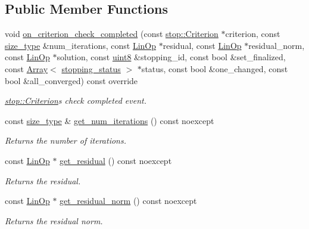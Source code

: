 \subsection*{Public Member Functions}
\begin{DoxyCompactItemize}
\item 
void \hyperlink{classgko_1_1log_1_1Convergence_ae20904a348216c22750c266372b07b6e}{on\+\_\+criterion\+\_\+check\+\_\+completed} (const \hyperlink{classgko_1_1stop_1_1Criterion}{stop\+::\+Criterion} $\ast$criterion, const \hyperlink{namespacegko_a6e5c95df0ae4e47aab2f604a22d98ee7}{size\+\_\+type} \&num\+\_\+iterations, const \hyperlink{classgko_1_1LinOp}{Lin\+Op} $\ast$residual, const \hyperlink{classgko_1_1LinOp}{Lin\+Op} $\ast$residual\+\_\+norm, const \hyperlink{classgko_1_1LinOp}{Lin\+Op} $\ast$solution, const \hyperlink{namespacegko_a3950fc3732811a8563484e5098c31531}{uint8} \&stopping\+\_\+id, const bool \&set\+\_\+finalized, const \hyperlink{classgko_1_1Array}{Array}$<$ \hyperlink{classgko_1_1stopping__status}{stopping\+\_\+status} $>$ $\ast$status, const bool \&one\+\_\+changed, const bool \&all\+\_\+converged) const override
\begin{DoxyCompactList}\small\item\em \hyperlink{classgko_1_1stop_1_1Criterion}{stop\+::\+Criterion}\textquotesingle{}s check completed event. \end{DoxyCompactList}\item 
const \hyperlink{namespacegko_a6e5c95df0ae4e47aab2f604a22d98ee7}{size\+\_\+type} \& \hyperlink{classgko_1_1log_1_1Convergence_ae4f2ae84d87df2bffa814f51a8f09793}{get\+\_\+num\+\_\+iterations} () const noexcept
\begin{DoxyCompactList}\small\item\em Returns the number of iterations. \end{DoxyCompactList}\item 
const \hyperlink{classgko_1_1LinOp}{Lin\+Op} $\ast$ \hyperlink{classgko_1_1log_1_1Convergence_a6595e7edae4cb080943493252b6d77e9}{get\+\_\+residual} () const noexcept
\begin{DoxyCompactList}\small\item\em Returns the residual. \end{DoxyCompactList}\item 
const \hyperlink{classgko_1_1LinOp}{Lin\+Op} $\ast$ \hyperlink{classgko_1_1log_1_1Convergence_a68297edb94aee77f6125c4b823f4503c}{get\+\_\+residual\+\_\+norm} () const noexcept
\begin{DoxyCompactList}\small\item\em Returns the residual norm. \end{DoxyCompactList}\end{DoxyCompactItemize}
